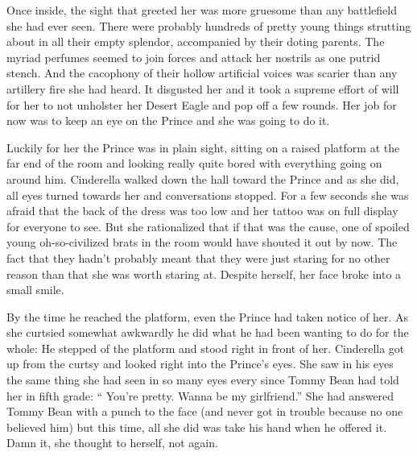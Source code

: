 \documentclass[11pt,letterpaper]{article}
\begin{document}
Once inside, the sight that greeted her was more gruesome than any battlefield she had ever seen. There were probably hundreds of pretty young things strutting about in all their empty splendor, accompanied by their doting parents. The myriad perfumes seemed to join forces and attack her nostrils as one putrid stench. And the cacophony of their hollow artificial voices was scarier than any artillery fire she had heard. It disgusted her and it took a supreme effort of will for her to not unholster her Desert Eagle and pop off a few rounds. Her job for now was to keep an eye on the Prince and she was going to do it.

Luckily for her the Prince was in plain sight, sitting on a raised platform at the far end of the room and looking really quite bored with everything going on around him. Cinderella walked down the hall toward the Prince and as she did, all eyes turned towards her and conversations stopped. For a few seconds she was afraid that the back of the dress was too low and her tattoo was on full display for everyone to see. But she rationalized that if that was the cause, one of spoiled young oh-so-civilized brats in the room would have shouted it out by now. The fact that they hadn't probably meant that they were just staring for no other reason than that she was worth staring at. Despite herself, her face broke into a small smile.

By the time he reached the platform, even the Prince had taken notice of her. As she curtsied somewhat awkwardly he did what he had been wanting to do for the whole: He stepped of the platform and stood right in front of her. Cinderella got up from the curtsy and looked right into the Prince's eyes. She saw in his eyes the same thing she had seen in so many eyes every since Tommy Bean had told her in fifth grade: `` You're pretty. Wanna be my girlfriend.'' She had answered Tommy Bean with a punch to the face (and never got in trouble because no one believed him) but this time, all she did was take his hand when he offered it. Damn it, she thought to herself, not again.
\end{document}
